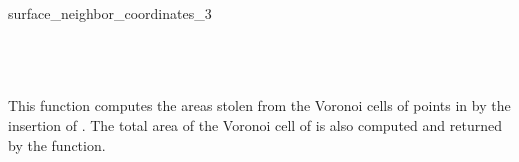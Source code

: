\begin{ccRefFunction}{surface_neighbor_coordinates_3}
\ccSeeAlso
{} \\
\\ 
\\ 
 \\

\ccImplementation This function computes the areas stolen from the
Voronoi cells of points in  by the insertion of . The
total area of the Voronoi cell of  is also computed and
returned by the function.

\end{ccRefFunction}


